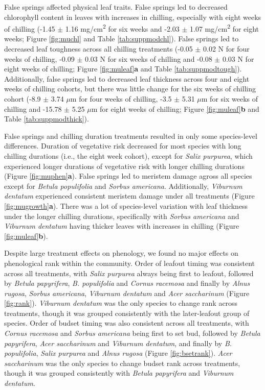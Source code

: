 \documentclass{article}\usepackage[]{graphicx}\usepackage[]{color}
\begin{document}
False springs affected physical leaf traits. False springs led to decreased chlorophyll content in leaves with increases in chilling, especially with eight weeks of chilling (-1.45 $\pm$ 1.16 mg/cm\textsuperscript{2} for six weeks and -2.03 $\pm$ 1.07 mg/cm\textsuperscript{2} for eight weeks; Figure \ref{fig:muchl} and Table \ref{tab:suppmodchl}). False springs led to decreased leaf toughness across all chilling treatments (-0.05 $\pm$ 0.02 N for four weeks of chilling, -0.09 $\pm$ 0.03 N for six weeks of chilling and -0.08 $\pm$ 0.03 N for eight weeks of chilling; Figure \ref{fig:muleaf}\textbf{a} and Table \ref{tab:suppmodtough}). Additionally, false springs led to decreased leaf thickness across four and eight weeks of chilling cohorts, but there was little change for the six weeks of chilling cohort (-8.9 $\pm$ 3.74 $\mu$m for four weeks of chilling, -3.5 $\pm$ 5.31 $\mu$m for six weeks of chilling and -15.78 $\pm$ 5.25 $\mu$m for eight weeks of chilling; Figure \ref{fig:muleaf}\textbf{b} and Table \ref{tab:suppmodthick}).
  
False springs and chilling duration treatments resulted in only some species-level differences. Duration of vegetative risk decreased for most species with long chilling durations (i.e., the eight week cohort), except for \textit{Salix purpurea}, which experienced longer durations of vegetative risk with longer chilling durations (Figure \ref{fig:muphen}\textbf{a}). False springs led to meristem damage agross all species except for \textit{Betula populifolia} and \textit{Sorbus americana}. Additionally, \textit{Viburnum dentatum} experienced consistent meristem damage under all treatments (Figure \ref{fig:mugrowth}\textbf{a}). There was a lot of species-level variation with leaf thickness under the longer chilling durations, specifically with \textit{Sorbus americana} and \textit{Viburnum dentatum} having thicker leaves with increases in chilling (Figure \ref{fig:muleaf}\textbf{b}). 
  
Despite large treatment effects on phenology, we found no major effects on phenological rank within the community. Order of leafout timing was consistent across all treatments, with \textit{Salix purpurea} always being first to leafout, followed by \textit{Betula papyrifera}, \textit{B. populifolia} and \textit{Cornus racemosa} and finally by \textit{Alnus rugosa}, \textit{Sorbus americana}, \textit{Viburnum dentatum} and \textit{Acer saccharinum} (Figure \ref{fig:rank}). \textit{Viburnum dentatum} was the only species to change rank across treatments, though it was grouped consistently with the later-leafout group of species. Order of budset timing was also consistent across all treatments, with \textit{Cornus racemosa} and \textit{Sorbus americana} being first to set bud, followed by \textit{Betula papyrifera}, \textit{Acer saccharinum} and \textit{Viburnum dentatum}, and finally by \textit{B. populifolia}, \textit{Salix purpurea} and \textit{Alnus rugosa} (Figure \ref{fig:bsetrank}). \textit{Acer saccharinum} was the only species to change budset rank across treatments, though it was grouped consistently with \textit{Betula papyrifera} and \textit{Viburnum dentatum}.
\end{document}
